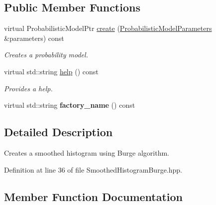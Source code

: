 \subsection*{Public Member Functions}
\begin{DoxyCompactItemize}
\item 
virtual Probabilistic\+Model\+Ptr \hyperlink{classtops_1_1SmoothedHistogramBurge_a7f148c400879d8594da5fedda12641b1}{create} (\hyperlink{classtops_1_1ProbabilisticModelParameters}{Probabilistic\+Model\+Parameters} \&parameters) const
\begin{DoxyCompactList}\small\item\em Creates a probability model. \end{DoxyCompactList}\item 
\mbox{\label{classtops_1_1SmoothedHistogramBurge_a3135346db37989216ee0b5769b670218}} 
virtual std\+::string \hyperlink{classtops_1_1SmoothedHistogramBurge_a3135346db37989216ee0b5769b670218}{help} () const
\begin{DoxyCompactList}\small\item\em Provides a help. \end{DoxyCompactList}\item 
\mbox{\label{classtops_1_1SmoothedHistogramBurge_ad13cfd0dfd6fd48d4d54ed7b8add4309}} 
virtual std\+::string {\bfseries factory\+\_\+name} () const
\end{DoxyCompactItemize}


\subsection{Detailed Description}
Creates a smoothed histogram using Burge algorithm. 

Definition at line 36 of file Smoothed\+Histogram\+Burge.\+hpp.



\subsection{Member Function Documentation}
\mbox{\label{classtops_1_1SmoothedHistogramBurge_a7f148c400879d8594da5fedda12641b1}} 

